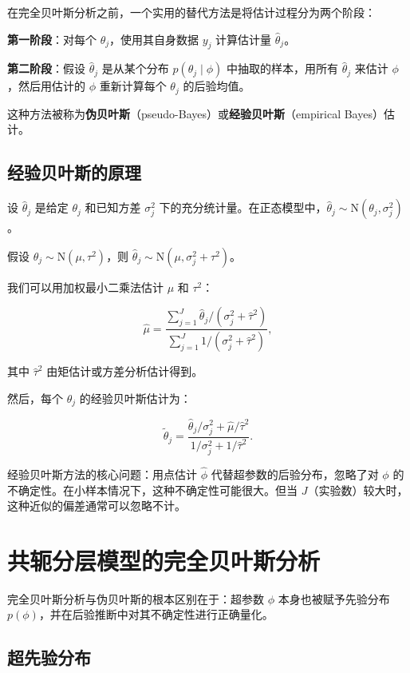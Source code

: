 在完全贝叶斯分析之前，一个实用的替代方法是将估计过程分为两个阶段：

\textbf{第一阶段}：对每个 $\theta_j$，使用其自身数据 $y_j$ 计算估计量 $\hat{\theta}_j$。

\textbf{第二阶段}：假设 $\hat{\theta}_j$ 是从某个分布 $p(\theta_j \mid \phi)$ 中抽取的样本，用所有 $\hat{\theta}_j$ 来估计 $\phi$，然后用估计的 $\phi$ 重新计算每个 $\theta_j$ 的后验均值。

这种方法被称为\textbf{伪贝叶斯}（pseudo-Bayes）或\textbf{经验贝叶斯}（empirical Bayes）估计。

\subsection{经验贝叶斯的原理}

设 $\hat{\theta}_j$ 是给定 $\theta_j$ 和已知方差 $\sigma_j^2$ 下的充分统计量。在正态模型中，$\hat{\theta}_j \sim \mathrm{N}(\theta_j, \sigma_j^2)$。

假设 $\theta_j \sim \mathrm{N}(\mu, \tau^2)$，则 $\hat{\theta}_j \sim \mathrm{N}(\mu, \sigma_j^2 + \tau^2)$。

我们可以用加权最小二乘法估计 $\mu$ 和 $\tau^2$：

\[
\hat{\mu} = \frac{\sum_{j=1}^{J} \hat{\theta}_j / (\sigma_j^2 + \hat{\tau}^2)}{\sum_{j=1}^{J} 1 / (\sigma_j^2 + \hat{\tau}^2)}, \label{eq:eb-mu-estimate}
\]

其中 $\hat{\tau}^2$ 由矩估计或方差分析估计得到。

然后，每个 $\theta_j$ 的经验贝叶斯估计为：

\[
\tilde{\theta}_j = \frac{\hat{\theta}_j / \sigma_j^2 + \hat{\mu} / \hat{\tau}^2}{1 / \sigma_j^2 + 1 / \hat{\tau}^2}. \label{eq:eb-theta-estimate}
\]

\begin{Remark}
  经验贝叶斯方法的核心问题：用点估计 $\hat{\phi}$ 代替超参数的后验分布，忽略了对 $\phi$ 的不确定性。在小样本情况下，这种不确定性可能很大。但当 $J$（实验数）较大时，这种近似的偏差通常可以忽略不计。
\end{Remark}

\section{共轭分层模型的完全贝叶斯分析}

完全贝叶斯分析与伪贝叶斯的根本区别在于：超参数 $\phi$ 本身也被赋予先验分布 $p(\phi)$，并在后验推断中对其不确定性进行正确量化。

\subsection{超先验分布}

